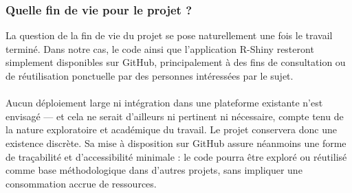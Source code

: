 \documentclass[12pt]{article}
\begin{document}
\subsubsection*{Quelle fin de vie pour le projet ?}
La question de la fin de vie du projet se pose naturellement une fois le travail terminé. Dans notre cas, le code ainsi que l’application R-Shiny resteront simplement disponibles sur GitHub, principalement à des fins de consultation ou de réutilisation ponctuelle par des personnes intéressées par le sujet.\\
\\
Aucun déploiement large ni intégration dans une plateforme existante n’est envisagé — et cela ne serait d’ailleurs ni pertinent ni nécessaire, compte tenu de la nature exploratoire et académique du travail. Le projet conservera donc une existence discrète. Sa mise à disposition sur GitHub assure néanmoins une forme de traçabilité et d’accessibilité minimale : le code pourra être exploré ou réutilisé comme base méthodologique dans d’autres projets, sans impliquer une consommation accrue de ressources.
\end{document}

